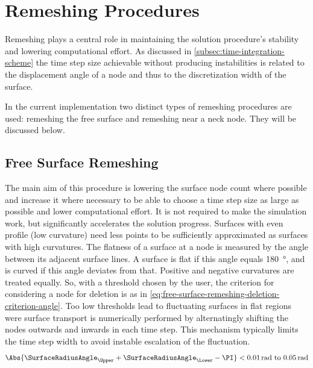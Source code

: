 \section{Remeshing Procedures}\label{sec:remeshing-procedures}

Remeshing plays a central role in maintaining the solution procedure's stability and lowering computational effort.
As discussed in \cref{subsec:time-integration-scheme} the time step size achievable without producing instabilities is related to the displacement angle of a node and thus to the discretization width of the surface.

In the current implementation two distinct types of remeshing procedures are used: remeshing the free surface and remeshing near a neck node.
They will be discussed below.

\subsection{Free Surface Remeshing}\label{sec:free-surface-remeshing}

The main aim of this procedure is lowering the surface node count where possible and increase it where necessary to be able to choose a time step size as large as possible and lower computational effort.
It is not required to make the simulation work, but significantly accelerates the solution progress.
Surfaces with even profile (low curvature) need less points to be sufficiently approximated as surfaces with high curvatures.
The flatness of a surface at a node is measured by the angle between its adjacent surface lines.
A surface is flat if this angle equals \qty{180}{\degree}, and is curved if this angle deviates from that.
Positive and negative curvatures are treated equally.
So, with a threshold chosen by the user, the criterion for considering a node for deletion is as in \cref{eq:free-surface-remeshing-deletion-criterion-angle}.
Too low thresholds lead to fluctuating surfaces in flat regions were surface transport is numerically performed by alternatingly shifting the nodes outwards and inwards in each time step.
This mechanism typically limits the time step width to avoid instable escalation of the fluctuation.
\begin{equation}
    \Abs{\SurfaceRadiusAngle_{\Upper} + \SurfaceRadiusAngle_{\Lower} - \PI} < \qtyrange{0.01}{0.05}{\radian}
    \label{eq:free-surface-remeshing-deletion-criterion-angle}
\end{equation}

